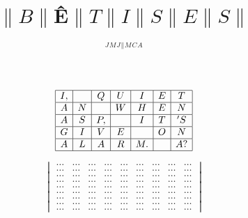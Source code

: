 \documentclass[titlepage, 12pt]{article}
\title{{$\|B\|$\^E$\|T\|I\|S\|E\|S\|$}}
\author{${}^J{}^M{}^J{}^\| {}^M{}^C{}^A$}
\date{}
\begin{document}
\maketitle

\begin{equation*}
    \left.
    \begin{array}{|c|c|c|c|c|c|c|}
        \hline I, & {} & Q & U & I & E & T \\
        \hline A & N & {} & W & H & E & N \\
        \hline A & S & P, & {} & I & T & 'S \\
        \hline G & I & V & E & {} & O & N \\
        \hline A & L & A & R & M. & {} & A? \\
        \hline 
    \end{array}
    \right.
\end{equation*}

\center
\break%

\begin{equation*} 
    \begin{vmatrix}
         \dots & \dots & \dots & \dots & \dots & \dots & \dots & \dots & \dots  \\
         \dots & \dots & \dots & \dots & \dots & \dots & \dots & \dots & \dots  \\
         \dots & \dots & \dots & \dots & \dots & \dots & \dots & \dots & \dots  \\ 
          \dots & \dots & \dots & \dots & \dots & \dots & \dots & \dots & \dots  \\
         \dots & \dots & \dots & \dots & \dots & \dots & \dots & \dots & \dots  \\ 
         \dots & \dots & \dots & \dots & \dots & \dots & \dots & \dots & \dots  \\ 
          \dots & \dots & \dots & \dots & \dots & \dots & \dots & \dots & \dots  \\
         \dots & \dots & \dots & \dots & \dots & \dots & \dots & \dots & \dots  \\ 
         \dots & \dots & \dots & \dots & \dots & \dots & \dots & \dots & \dots  
\end{vmatrix} 
\end{equation*}
\end{document}
